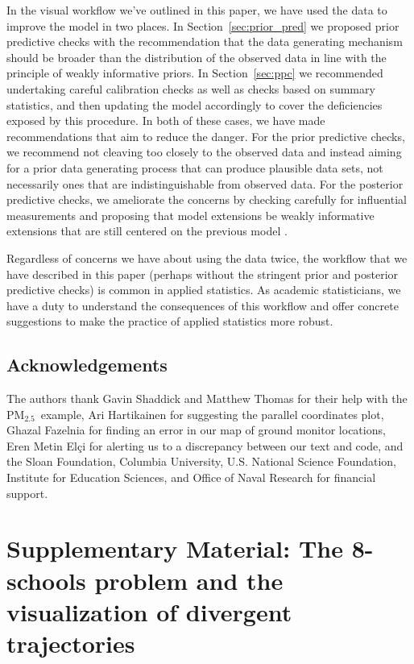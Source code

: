 \documentclass{statsoc}
\newcommand{\PM}{PM$_{2.5}$}
\begin{document}
In the visual workflow we've outlined in this paper, we have used the data to
improve the model in two places. In Section~\ref{sec:prior_pred} we proposed
prior predictive checks with the recommendation that the data generating
mechanism should be broader than the distribution of the observed data in line
with the principle of weakly informative priors. In Section~\ref{sec:ppc} we
recommended undertaking careful calibration checks as well as checks based on
summary statistics, and then updating the model accordingly to cover the
deficiencies exposed by this procedure. In both of these cases, we have made
recommendations that aim to reduce the danger. For the prior predictive checks,
we recommend not cleaving too closely to the observed data and instead aiming
for a prior data generating process that can produce plausible data sets, not
necessarily ones that are indistinguishable from observed data. For the
posterior predictive checks, we ameliorate the concerns by checking carefully
for influential measurements and proposing that model extensions be weakly
informative extensions that are still centered on the previous model
\citep{simpson2017penalising}.

Regardless of concerns we have about using the data twice, the workflow that we
have described in this paper (perhaps without the stringent prior and posterior
predictive checks) is common in applied statistics. As academic statisticians,
we have a duty to understand the consequences of this workflow and offer
concrete suggestions to make the practice of applied statistics more robust.

\subsection*{Acknowledgements}

The authors thank Gavin Shaddick and Matthew Thomas for their help with the \PM\
example, Ari Hartikainen for suggesting the parallel coordinates plot, 
Ghazal Fazelnia for finding an error in our map of ground monitor locations, 
Eren Metin El\c{c}i for alerting us to a discrepancy between our text and code, 
and the Sloan Foundation, Columbia University, U.S. National Science Foundation,
Institute for Education Sciences, and Office of Naval Research for financial support.







\clearpage
\section*{Supplementary Material: The 8-schools problem and the visualization of divergent trajectories} 
\end{document}
